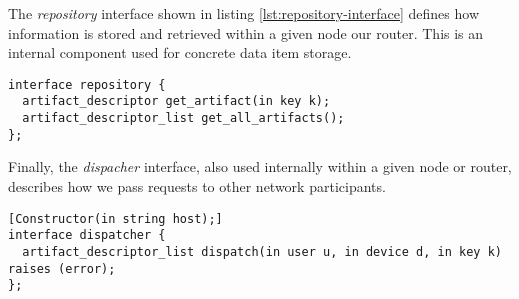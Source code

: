 The \emph{repository} interface shown in listing \ref{lst:repository-interface} defines how information is stored and retrieved within a given node our router.  This is an internal component used for concrete data item storage.

\begin{lstlisting}[language=idl, label=lst:repository-interface, caption=The Repository Interface]
interface repository {
  artifact_descriptor get_artifact(in key k);
  artifact_descriptor_list get_all_artifacts();
};
\end{lstlisting}

Finally, the \emph{dispacher} interface, also used internally within a given node or router, describes how we pass requests to other network participants.

\begin{lstlisting}[language=idl, label=lst:dispatcher-interface, caption=The Dispatcher Interface]
[Constructor(in string host);]
interface dispatcher {
  artifact_descriptor_list dispatch(in user u, in device d, in key k) raises (error);
};
\end{lstlisting}
